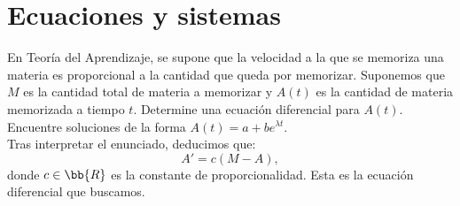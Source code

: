 \section{Ecuaciones y sistemas}

\begin{ejercicio}
    En Teoría del Aprendizaje, se supone que la velocidad a la que se memoriza una materia es proporcional a la
    cantidad que queda por memorizar. Suponemos que \(M\) es la cantidad total de materia a memorizar y \(A(t)\) es la
    cantidad de materia memorizada a tiempo \(t\). Determine una ecuación diferencial para \(A(t)\). Encuentre soluciones
    de la forma \(A(t) = a + be^{\lambda t}\).\\

    Tras interpretar el enunciado, deducimos que:
    \begin{equation*}
        A' = c(M - A),
    \end{equation*}
    donde $c\in \bb{R}$ es la constante de proporcionalidad. Esta es la ecuación diferencial que buscamos.

\end{ejercicio}

